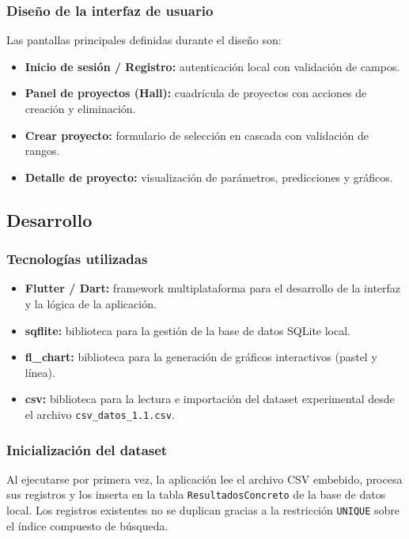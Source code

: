 \subsubsection*{Diseño de la interfaz de usuario}

Las pantallas principales definidas durante el diseño son:
\begin{itemize}
    \item \textbf{Inicio de sesión / Registro:} autenticación local con validación de campos.
    \item \textbf{Panel de proyectos (Hall):} cuadrícula de proyectos con acciones de creación y eliminación.
    \item \textbf{Crear proyecto:} formulario de selección en cascada con validación de rangos.
    \item \textbf{Detalle de proyecto:} visualización de parámetros, predicciones y gráficos.
\end{itemize}

\subsection{Desarrollo}

\subsubsection*{Tecnologías utilizadas}

\begin{itemize}
    \item \textbf{Flutter / Dart:} framework multiplataforma para el desarrollo de la interfaz y la lógica de la aplicación.
    \item \textbf{sqflite:} biblioteca para la gestión de la base de datos SQLite local.
    \item \textbf{fl\_chart:} biblioteca para la generación de gráficos interactivos (pastel y línea).
    \item \textbf{csv:} biblioteca para la lectura e importación del dataset experimental desde el archivo \texttt{csv\_datos\_1.1.csv}.
\end{itemize}

\subsubsection*{Inicialización del dataset}

Al ejecutarse por primera vez, la aplicación lee el archivo CSV embebido, procesa sus registros y los inserta en la tabla \texttt{ResultadosConcreto} de la base de datos local. Los registros existentes no se duplican gracias a la restricción \texttt{UNIQUE} sobre el índice compuesto de búsqueda.

